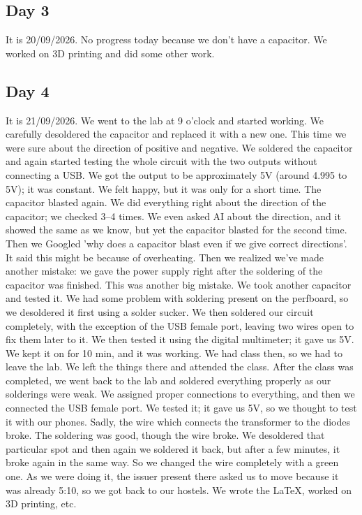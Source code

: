 \documentclass[11pt, a4paper]{article}
\begin{document}
\subsection*{Day 3}
It is 20/09/2026. No progress today because we don't have a capacitor. We worked on 3D printing and did some other work.

\subsection*{Day 4}
It is 21/09/2026. We went to the lab at 9 o'clock and started working. We carefully desoldered the capacitor and replaced it with a new one. This time we were sure about the 
direction of positive and negative. We soldered the capacitor and again started testing the whole circuit with the two   outputs without connecting a USB. We got the output 
to be approximately 5V (around 4.995 to 5V); it was constant. We felt happy, but it was only for a short time. The capacitor blasted again. We did everything right about the direction
of the capacitor; we checked 3--4 times. We even asked AI about the direction, and it showed the same as we know, but yet the capacitor blasted for the second time. Then we Googled
'why does a capacitor blast even if we give correct directions'. It said this might be because of overheating. Then we realized we've made another mistake: we gave the power supply 
right after the soldering of the capacitor was finished. This was another big mistake. We took another capacitor and tested it. We had some problem with soldering present on the perfboard, 
so we desoldered it first using a solder sucker. We then soldered our circuit completely, with the exception of the USB female port, leaving two wires open to fix them later to it. We then tested it using
the digital multimeter; it gave us 5V. We kept it on for 10 min, and it was working. We had class then, so we had to leave the lab. We left the things there and attended the class. After the class
was completed, we went back to the lab and soldered everything properly as our solderings were weak. We assigned proper connections to everything, and then we connected the USB female port. We tested it;
it gave us 5V, so we thought to test it with our phones. Sadly, the wire which connects the transformer to the diodes broke. The soldering was good, though the wire broke. We desoldered that particular 
spot and then again we soldered it back, but after a few minutes, it broke again in the same way. So we changed the wire completely with a green one. As we were doing it, the issuer present there asked
us to move because it was already 5:10, so we got back to our hostels. We wrote the LaTeX, worked on 3D printing, etc.
\end{document}
